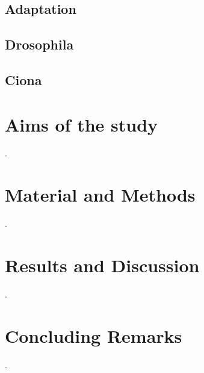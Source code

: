 \documentclass[officiallayout]{tktla_modified}
\begin{document}
	\section{Adaptation}
	
	\clearpage
	\section{Drosophila}
	
	\clearpage
	\section{Ciona}
	
	\clearpage

\chapter{Aims of the study}
.


\chapter{Material and Methods}
.


\chapter{Results and Discussion}
.



\chapter{Concluding Remarks}
.


\listoffigures
\printnomenclature

%


\end{document}
